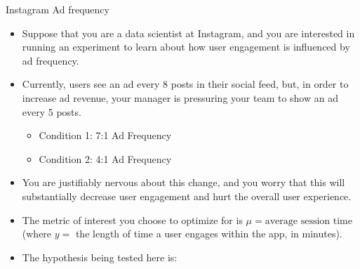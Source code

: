 \begin{Example}{Instagram Ad frequency}{}
      \begin{itemize}
            \item Suppose that you are a data scientist at Instagram, and you are interested
                  in running an experiment to learn about how user engagement is influenced by ad frequency.
            \item Currently, users see an ad every 8 posts in their social feed, but, in order
                  to increase ad revenue, your manager is pressuring your team to show an ad every 5 posts.
                  \begin{itemize}
                        \item Condition 1: 7:1 Ad Frequency
                        \item Condition 2: 4:1 Ad Frequency
                  \end{itemize}
            \item You are justifiably nervous about this change, and you worry that this
                  will substantially decrease user engagement and hurt the overall user experience.
            \item The metric of interest you choose to optimize for is $ \mu=\text{average session time} $
                  (where $ y =$ the length of time a user engages within the app, in minutes).
            \item The hypothesis being tested here is:


\end{itemize}
\end{Example}
